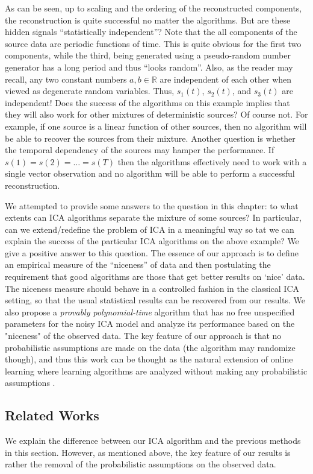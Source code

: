\documentclass[11pt]{article}
\newcommand{\real}{\mathbb{R}}
\begin{document}
As can be seen, 
up to scaling and the ordering of the reconstructed components, the reconstruction is quite successful no matter the algorithms.
But are these hidden signals ``statistically independent''?
Note that the all components of the source data are periodic functions of time. 
This is quite obvious for the first two components, while the third, being generated using a pseudo-random number generator has a long period and thus ``looks random''.
Also, as the reader may recall, any two constant numbers $a,b \in \real$ are independent of each other when viewed as degenerate random variables. Thus, $s_1(t)$, $s_2(t)$, and $s_3(t)$ are independent! 
Does the success of the algorithms on this example implies that they will also work for other mixtures of deterministic sources? Of course not. 
For example, if one source is a linear function of other sources, then no algorithm will be able to recover the sources from their mixture.
Another question is whether the temporal dependency of the sources may hamper the performance. 
If $s(1) = s(2) = \dots = s(T)$ then the algorithms effectively need to work with a single vector observation and no algorithm will be able to perform a successful reconstruction. 

We attempted to provide some answers to the question in this chapter: to what extents can ICA algorithms separate the mixture of some sources? 
In particular, can we extend/redefine the problem of ICA in a meaningful way so tat we can explain the success of the particular ICA algorithms on the above example?
We give a positive answer to this question.
The essence of our approach is to define an empirical measure of the ``niceness'' of data and then postulating the requirement that good algorithms are those that get better results on `nice' data.
The niceness measure should behave in a controlled fashion in the classical ICA setting, so that the usual statistical results can be recovered from our results. 
We also propose a \emph{provably polynomial-time} algorithm that has no free unspecified parameters for the noisy ICA model and analyze its performance based on the "niceness" of the observed data. 
The key feature of our approach is that no probabilistic assumptions are made on the data (the algorithm may randomize though), and thus this work can be thought as the natural extension of online learning
where learning algorithms are analyzed without making any probabilistic assumptions \citep{CBLu06:book}.

\subsection{Related Works}
\label{subsec:ICArelatedWorks}
We explain the difference between our ICA algorithm and the previous methods in this section. 
However, as mentioned above, the key feature of our results is rather the removal of the probabilistic assumptions on the observed data.
\end{document}
